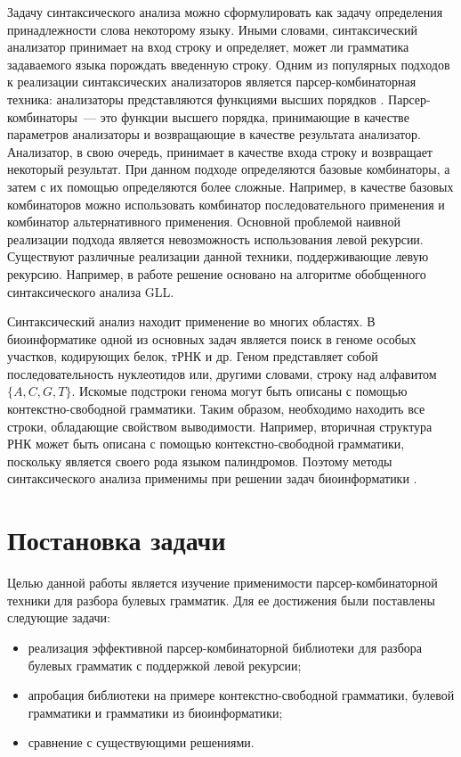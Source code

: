Задачу синтаксического анализа можно сформулировать как задачу определения принадлежности слова некоторому языку. Иными словами, синтаксический анализатор принимает на вход строку и определяет, может ли грамматика задаваемого языка порождать введенную строку. Одним из популярных подходов к реализации синтаксических анализаторов является парсер-комбинаторная техника: анализаторы представляются функциями высших порядков \cite{hutton1996monadic}. Парсер-комбинаторы~--- это функции высшего порядка, принимающие в качестве параметров анализаторы и возвращающие в качестве результата анализатор. Анализатор, в свою очередь, принимает в качестве входа строку и возвращает некоторый результат. При данном подходе определяются базовые комбинаторы, а затем с их помощью определяются более сложные. Например, в качестве базовых комбинаторов можно использовать комбинатор последовательного применения и комбинатор альтернативного применения. 
Основной проблемой наивной реализации подхода является невозможность использования левой рекурсии. Существуют различные реализации данной техники, поддерживающие левую рекурсию. Например, в работе \cite{spiewak2010generalized} решение основано на алгоритме обобщенного синтаксического анализа GLL.


Синтаксический анализ находит применение во многих областях. В биоинформатике одной из основных задач является поиск в геноме особых участков, кодирующих белок, тРНК и др. Геном представляет собой последовательность нуклеотидов или, другими словами, строку над алфавитом $\{A, C, G, T\}$. Искомые подстроки генома могут быть описаны с помощью контекстно-свободной грамматики. Таким образом, необходимо находить все строки, обладающие свойством выводимости. Например, вторичная структура РНК может быть описана с помощью контекстно-свободной грамматики, поскольку является своего рода языком палиндромов. Поэтому методы синтаксического анализа применимы при решении задач биоинформатики \cite{sippl1999biological}.

\section{Постановка задачи}

Целью данной работы является изучение применимости парсер-комбинаторной техники
для разбора булевых грамматик. Для ее достижения были поставлены следующие задачи:

\begin{itemize}
    \item реализация эффективной парсер-комбинаторной библиотеки для разбора булевых грамматик с поддержкой левой рекурсии;
    \item апробация библиотеки на примере контекстно-свободной грамматики, булевой грамматики и грамматики из биоинформатики;
    \item сравнение с существующими решениями.
\end{itemize}

